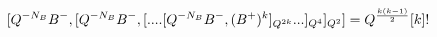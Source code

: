 \begin{equation}
\lbrack
Q^{-N_B}B^{-},[Q^{-N_B}B^{-},[....[Q^{-N_B}B^{-},(B^{+})^k]_{Q^{2k}}...]_{Q^4}]_{Q^2}]=Q^{%
\frac{k(k-1)}2}[k]!
\end{equation}

